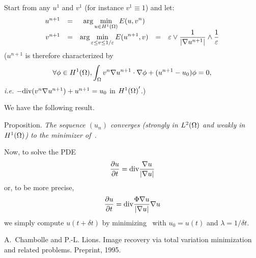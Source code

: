 Start from any $u^1$ and $v^1$ (for instance $v^1\equiv 1$) and
let:
\begin{equation}
\begin{array}{rcccl}
u^{n+1} &=& \displaystyle{\mbox{arg}\min_{u\in {H}^1(\Omega)} E(u,v^n)} & & \\
v^{n+1} &=& \displaystyle{\mbox{arg}\min_{\varepsilon\leq v \leq 1/\varepsilon} E(u^{n+1},v)} &=&
\displaystyle{ \varepsilon\vee {1\over |\nabla u^{n+1}|} \wedge {1\over \varepsilon}}
\end{array}\end{equation}
($u^{n+1}$ is therefore characterized by
\[ \forall \phi\in {H}^1(\Omega), \int_\Omega v^n\nabla u^{n+1}\cdot\nabla \phi
+ (u^{n+1}-u_0) \phi = 0, \]
{\em i.e.\/} $-\mbox{div}(v^n\nabla u^{n+1}) + u^{n+1} = u_0$ in ${{H}^1(\Omega)}'$.)

We have the following result.
\medskip

{\sc Proposition. }
{\em The sequence $(u_n)$
converges (strongly in ${L}^{2}(\Omega)$ and weakly in ${H}^1(\Omega)$)
to the minimizer of~.}
\medskip

Now, to solve the PDE
\[ \frac{\partial u}{\partial t} = \mbox{div} \frac{\nabla u}{|\nabla u|} \]
or, to be more precise,
\[ \frac{\partial u}{\partial t} = \mbox{div} \frac{\Phi{\nabla u}}{|\nabla u|}\nabla u \]
we simply compute $u(t+\delta t)$ by minimizing~ with
$u_0 = u(t)$ and $\lambda = 1/\delta t$.

\begin{thebibliography}{99}
A.~Chambolle and P.-L. Lions.
\newblock Image recovery via total variation minimization and related problems.
\newblock Preprint, 1995.
\end{thebibliography}
